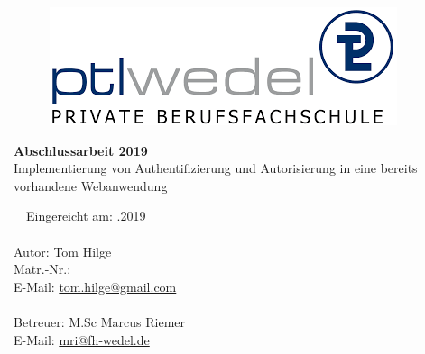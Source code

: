 \thispagestyle{empty}

\begin{figure}[h]
	\hfill\includegraphics[scale=0.5]{graphics/ptl-logo.png}
\end{figure}
\vspace*{15ex}

\begin{center}
	\textbf{{\LARGE Abschlussarbeit 2019}}\\
	\vspace*{2ex}
	{\large Implementierung von Authentifizierung und Autorisierung in eine bereits vorhandene Webanwendung}\\
\end{center}

\vspace*{15ex}
\begin{tabbing}
	\hspace{8em} \= \hspace{14em} \= \hspace{8em} \= \kill
	Eingereicht am: .2019\\\\
	
	Autor:\> Tom Hilge\\
	Matr.-Nr.:\\
	E-Mail:\> \href{mailto:tom.hilge@gmail.com}{tom.hilge@gmail.com}\\\\
	
	Betreuer:\> M.Sc Marcus Riemer\\
	E-Mail:\> \href{mailto:mri@fh-wedel.de}{mri@fh-wedel.de}
\end{tabbing}